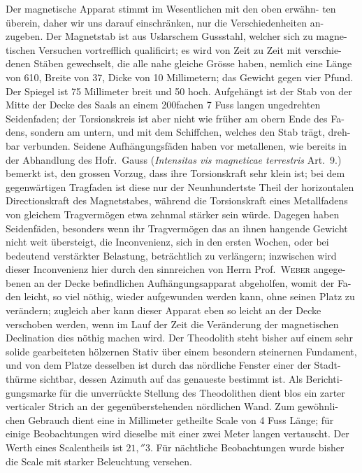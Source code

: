 \documentclass[12pt,a4paper]{article}
\begin{document}
Der magnetische Apparat stimmt im Wesentlichen mit den oben erwähn-
ten überein, daher wir uns darauf einschränken, nur die Verschiedenheiten an-
zugeben. Der Magnetstab ist aus Uslarschem Gussstahl, welcher sich zu magne-
tischen Versuchen vortrefflich qualificirt; es wird von Zeit zu Zeit mit verschie-
denen Stäben gewechselt, die alle nahe gleiche Grösse haben, nemlich eine Länge 
von 610, Breite von 37, Dicke von 10 Millimetern; das Gewicht gegen vier Pfund. 
Der Spiegel ist 75 Millimeter breit und 50 hoch. Aufgehängt ist der Stab von 
der Mitte der Decke des Saals an einem 200fachen 7 Fuss langen ungedrehten 
Seidenfaden; der Torsionskreis ist aber nicht wie früher am obern Ende des Fa-
dens, sondern am untern, und mit dem Schiffchen, welches den Stab trägt, dreh-
bar verbunden. Seidene Aufhängungsfäden haben vor metallenen, wie bereits 
in der Abhandlung des Hofr.\ Gauss (\textit{Intensitas vis magneticae terrestris} Art.\ 9.) 
bemerkt ist, den grossen Vorzug, dass ihre Torsionskraft sehr klein ist; bei dem 
gegenwärtigen Tragfaden ist diese nur der Neunhundertste Theil der horizontalen 
Directionskraft des Magnetstabes, während die Torsionskraft eines Metallfadens 
von gleichem Tragvermögen etwa zehnmal stärker sein würde. Dagegen haben 
Seidenfäden, besonders wenn ihr Tragvermögen das an ihnen hangende Gewicht 
nicht weit übersteigt, die Inconvenienz, sich in den ersten Wochen, oder bei 
bedeutend verstärkter Belastung, beträchtlich zu verlängern; inzwischen wird 
dieser Inconvenienz hier durch den sinnreichen von Herrn Prof.\ \textsc{Weber} angege-
benen an der Decke befindlichen Aufhängungsapparat abgeholfen, womit der Fa-
den leicht, so viel nöthig, wieder aufgewunden werden kann, ohne seinen Platz 
zu verändern; zugleich aber kann dieser Apparat eben so leicht an der Decke 
verschoben werden, wenn im Lauf der Zeit die Veränderung der magnetischen 
Declination dies nöthig machen wird. Der Theodolith steht bisher auf einem sehr 
solide gearbeiteten hölzernen Stativ über einem besondern steinernen Fundament, 
und von dem Platze desselben ist durch das nördliche Fenster einer der Stadt-
thürme sichtbar, dessen Azimuth auf das genaueste bestimmt ist. Als Berichti-
gungsmarke für die unverrückte Stellung des Theodolithen dient blos ein zarter 
verticaler Strich an der gegenüberstehenden nördlichen Wand. Zum gewöhnli-
chen Gebrauch dient eine in Millimeter getheilte Scale von 4 Fuss Länge; für 
einige Beobachtungen wird dieselbe mit einer zwei Meter langen vertauscht. Der 
Werth eines Scalentheils ist $21{,}''3$. Für nächtliche Beobachtungen wurde bisher 
die Scale mit starker Beleuchtung versehen.
\end{document}
